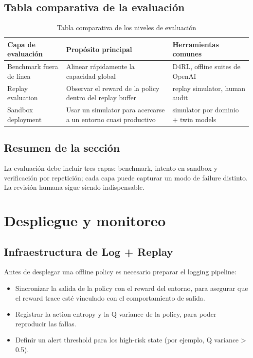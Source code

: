 \documentclass[a4paper]{article}
\begin{document}
\subsection{Tabla comparativa de la evaluación}

\begin{table}[H]
\centering
\begin{tabular}{p{} p{} p{}}
\toprule
Capa de evaluación & Propósito principal & Herramientas comunes \\
\midrule
Benchmark fuera de línea & Alinear rápidamente la capacidad global & D4RL, offline suites de OpenAI \\
Replay evaluation & Observar el reward de la policy dentro del replay buffer & replay simulator, human audit \\
Sandbox deployment & Usar un simulator para acercarse a un entorno cuasi productivo & simulator por dominio + twin models \\
\bottomrule
\end{tabular}
\caption{Tabla comparativa de los niveles de evaluación}
\end{table}

\subsection{Resumen de la sección}

La evaluación debe incluir tres capas: benchmark, intento en sandbox y verificación por repetición; cada capa puede capturar un modo de failure distinto. La revisión humana sigue siendo indispensable.

\section{Despliegue y monitoreo}

\subsection{Infraestructura de Log + Replay}

Antes de desplegar una offline policy es necesario preparar el logging pipeline:

\begin{itemize}
    \item Sincronizar la salida de la policy con el reward del entorno, para asegurar que el reward trace esté vinculado con el comportamiento de salida.
    \item Registrar la action entropy y la Q variance de la policy, para poder reproducir las fallas.
    \item Definir un alert threshold para los high-risk state (por ejemplo, Q variance > 0.5).
\end{itemize}
\end{document}
